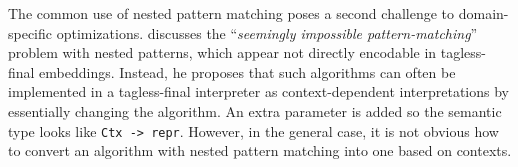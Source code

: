 \noindent
The common use of nested pattern matching poses a second challenge to
domain-specific optimizations. \citet{kiselyov2010typed} discusses the
``\emph{seemingly impossible pattern-matching}'' problem with nested patterns,
which appear not directly encodable in tagless-final embeddings. Instead, he
proposes that such algorithms can often be implemented in a tagless-final
interpreter as context-dependent interpretations by essentially changing the
algorithm. An extra parameter is added so the semantic type looks like
\lstinline{Ctx -> repr}. However, in the general case, it is not obvious how to
convert an algorithm with nested pattern matching into one based on contexts. 
